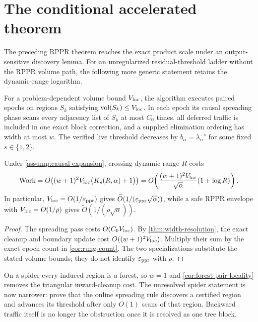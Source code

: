 \section{The conditional accelerated theorem}
\label{sec:conditional}

The preceding RPPR theorem reaches the exact product scale under an
output-sensitive discovery lemma.  For an unregularized residual-threshold
ladder without the RPPR volume path, the following more generic statement
retains the dynamic-range logarithm.

\begin{assumption}
\label{assump:causal-expansion}
For a problem-dependent volume bound $V_{\rm loc}$, the algorithm executes
paired epochs on regions $S_k$ satisfying $\operatorname{vol}(S_k)\leq V_{\rm loc}$.  In
each epoch its causal spreading phase scans every adjacency list of $S_k$ at
most $C_0$ times, all deferred traffic is included in one exact block
correction, and a supplied elimination ordering has width at most $w$.  The
verified live threshold decreases by
$b_\alpha=\lambda_\alpha^{-s}$ for some fixed $s\in\{1,2\}$.
\end{assumption}

\begin{theorem}
\label{thm:conditional-work}
Under \cref{assump:causal-expansion}, crossing dynamic range $R$ costs
\begin{equation}
 \operatorname{Work}
 =O\!\left(
  (w+1)^2V_{\rm loc}\bigl(K_s(R,\alpha)+1\bigr)
 \right)
 =O\!\left(
   \frac{(w+1)^2 V_{\rm loc}}{\sqrt\alpha}(1+\log R)
  \right).
 \label{eq:conditional-work}
\end{equation}
In particular, $V_{\rm loc}=O(1/\varepsilon_{\mathrm{ppr}})$ gives
$\widetilde O(1/(\varepsilon_{\mathrm{ppr}}\sqrt\alpha))$, while a safe RPPR envelope with
$V_{\rm loc}=O(1/\rho)$ gives
$\widetilde O(1/(\rho\sqrt\alpha))$.
\end{theorem}

\begin{proof}
The spreading pass costs $O(C_0V_{\rm loc})$.  By
\cref{thm:width-resolution}, the exact cleanup and boundary update cost
$O((w+1)^2V_{\rm loc})$.  Multiply their sum by the exact epoch count in
\cref{cor:rung-count}.  The two specializations substitute the stated volume
bounds; they do not identify $\varepsilon_{\mathrm{ppr}}$ with $\rho$.
\end{proof}

On a spider every induced region is a forest, so $w=1$ and
\cref{cor:forest-pair-locality} removes the triangular inward-cleanup cost.
The unresolved spider statement is now narrower: prove that the online
spreading rule discovers a certified region and advances its threshold after
only $O(1)$ scans of that region.  Backward traffic itself is no longer the
obstruction once it is resolved as one tree block.
